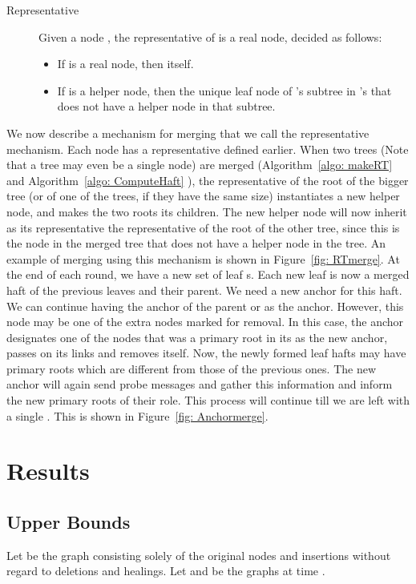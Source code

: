 \documentclass[11pt, letter]{article}
\begin{document}
\begin{description}
\item[Representative]
Given a node , the representative of  is a real node, decided as follows:
\begin{itemize}
 \item If  is a real node, then  itself.
 \item If  is a helper node, then the unique leaf node of 's subtree in 's  that does not have a helper node in that
subtree. 
\end{itemize}
\end{description}

 We now describe a mechanism for merging that we call the representative mechanism. Each node has a representative defined earlier. When
two trees (Note that a tree may even be a single node) are merged (Algorithm~\ref{algo: makeRT} and Algorithm~\ref{algo:
ComputeHaft} ), the representative of
the root of the bigger tree (or of one of the trees, if they have the same size) instantiates a new helper node, and
makes the two roots its children. The new helper node will now inherit as its representative the representative of the
root of the other tree, since this is the node in the merged tree that does not have a helper node in the tree. An
example of merging using this mechanism is shown in Figure~\ref{fig: RTmerge}.
 At the end of each round, we have a  new set of leaf s. Each new leaf is now a
merged haft of the previous leaves and their parent. We need a new anchor for this haft. We can continue having the
anchor of the parent  or  as the anchor. However, this
 node may be one of the extra nodes marked for removal. In this case, the anchor designates one of the nodes that was
 a primary root in its  as the new anchor, passes on its links and removes itself.
 Now, the newly formed leaf hafts may have primary roots which are different from those of the previous ones. The new
anchor will again send probe messages and gather this information and inform the new primary roots of their role. This
process will continue till we are left with a single . This is shown in Figure~\ref{fig: Anchormerge}. 

\section{Results}
\label{sec: Results}

\subsection{Upper Bounds}
\label{subsec: upperbounds}
Let  be the graph consisting solely of the original nodes and insertions without regard to deletions and
healings. Let  and  be the graphs at time . 
\end{document}
